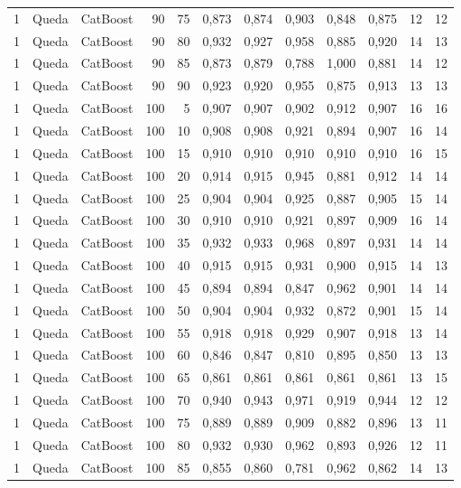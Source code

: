 \begin{longtable}{@{}rllrrrrrrrrr@{}}
1 & Queda & CatBoost & 90 & 75 & 0,873 & 0,874 & 0,903 & 0,848 & 0,875 & 12 & 12 \\
1 & Queda & CatBoost & 90 & 80 & 0,932 & 0,927 & 0,958 & 0,885 & 0,920 & 14 & 13 \\
1 & Queda & CatBoost & 90 & 85 & 0,873 & 0,879 & 0,788 & 1,000 & 0,881 & 14 & 12 \\
1 & Queda & CatBoost & 90 & 90 & 0,923 & 0,920 & 0,955 & 0,875 & 0,913 & 13 & 13 \\
1 & Queda & CatBoost & 100 & 5 & 0,907 & 0,907 & 0,902 & 0,912 & 0,907 & 16 & 16 \\
1 & Queda & CatBoost & 100 & 10 & 0,908 & 0,908 & 0,921 & 0,894 & 0,907 & 16 & 14 \\
1 & Queda & CatBoost & 100 & 15 & 0,910 & 0,910 & 0,910 & 0,910 & 0,910 & 16 & 15 \\
1 & Queda & CatBoost & 100 & 20 & 0,914 & 0,915 & 0,945 & 0,881 & 0,912 & 14 & 14 \\
1 & Queda & CatBoost & 100 & 25 & 0,904 & 0,904 & 0,925 & 0,887 & 0,905 & 15 & 14 \\
1 & Queda & CatBoost & 100 & 30 & 0,910 & 0,910 & 0,921 & 0,897 & 0,909 & 16 & 14 \\
1 & Queda & CatBoost & 100 & 35 & 0,932 & 0,933 & 0,968 & 0,897 & 0,931 & 14 & 14 \\
1 & Queda & CatBoost & 100 & 40 & 0,915 & 0,915 & 0,931 & 0,900 & 0,915 & 14 & 13 \\
1 & Queda & CatBoost & 100 & 45 & 0,894 & 0,894 & 0,847 & 0,962 & 0,901 & 14 & 14 \\
1 & Queda & CatBoost & 100 & 50 & 0,904 & 0,904 & 0,932 & 0,872 & 0,901 & 15 & 14 \\
1 & Queda & CatBoost & 100 & 55 & 0,918 & 0,918 & 0,929 & 0,907 & 0,918 & 13 & 14 \\
1 & Queda & CatBoost & 100 & 60 & 0,846 & 0,847 & 0,810 & 0,895 & 0,850 & 13 & 13 \\
1 & Queda & CatBoost & 100 & 65 & 0,861 & 0,861 & 0,861 & 0,861 & 0,861 & 13 & 15 \\
1 & Queda & CatBoost & 100 & 70 & 0,940 & 0,943 & 0,971 & 0,919 & 0,944 & 12 & 12 \\
1 & Queda & CatBoost & 100 & 75 & 0,889 & 0,889 & 0,909 & 0,882 & 0,896 & 13 & 11 \\
1 & Queda & CatBoost & 100 & 80 & 0,932 & 0,930 & 0,962 & 0,893 & 0,926 & 12 & 11 \\
1 & Queda & CatBoost & 100 & 85 & 0,855 & 0,860 & 0,781 & 0,962 & 0,862 & 14 & 13 \\

\end{longtable}
